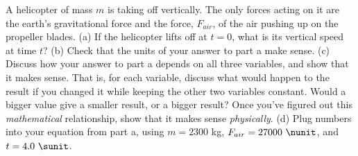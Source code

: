   A helicopter of mass $m$ is taking off vertically. The
only forces acting on it are the earth's gravitational force
and the force, $F_{air}$, of the air pushing up on the
propeller blades.\hwendpart
 (a) If the helicopter lifts off at $t=0$,
what is its vertical speed at time $t$?\hwendpart
 (b) Check that the units of your answer to part a make sense.\hwendpart
(c) Discuss how your answer to part a depends on all three
variables, and show that it makes sense. That is, for each
variable, discuss what would happen to the result if you
changed it while keeping the other two variables constant.
Would a bigger value give a smaller result, or a bigger
result? Once you've figured out this \emph{mathematical}
relationship, show that it makes sense \emph{physically}.\hwendpart
 (d) Plug numbers
into your equation from part a, using $m=2300$ kg,
$F_{air}=27000\ \nunit$, and $t=4.0\ \sunit$.
\answercheck
